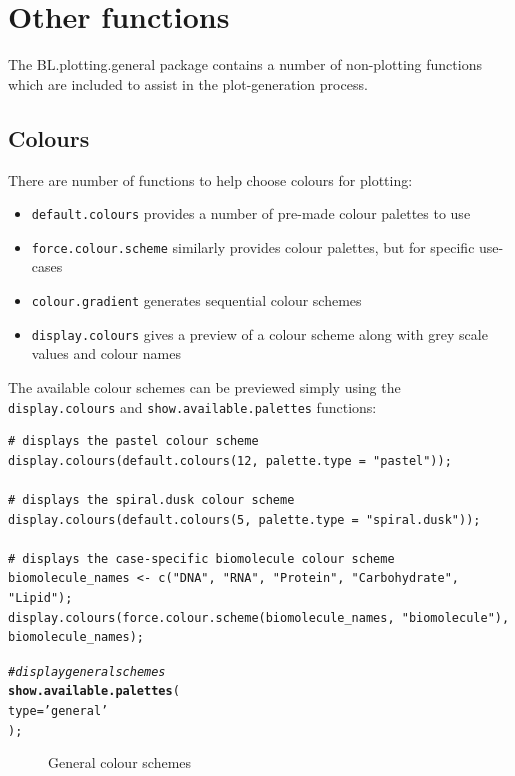 \documentclass[letterpaper]{report}\usepackage[]{graphicx}\usepackage[]{color}
\makeatletter
\newcommand{\hlstr}[1]{\textcolor[rgb]{0.192,0.494,0.8}{#1}}%
\newcommand{\hlcom}[1]{\textcolor[rgb]{0.678,0.584,0.686}{\textit{#1}}}%
\newcommand{\hlstd}[1]{\textcolor[rgb]{0.345,0.345,0.345}{#1}}%
\newcommand{\hlkwc}[1]{\textcolor[rgb]{0.333,0.667,0.333}{#1}}%
\newcommand{\hlkwd}[1]{\textcolor[rgb]{0.737,0.353,0.396}{\textbf{#1}}}%
\newenvironment{kframe}{%
 \def\at@end@of@kframe{}%
 \ifinner\ifhmode%
  \def\at@end@of@kframe{\end{minipage}}%
  \begin{minipage}{\columnwidth}%
 \fi\fi%
 \def\FrameCommand##1{\hskip\@totalleftmargin \hskip-\fboxsep
 \colorbox{shadecolor}{##1}\hskip-\fboxsep
     \hskip-\linewidth \hskip-\@totalleftmargin \hskip\columnwidth}%
 \MakeFramed {\advance\hsize-\width
   \@totalleftmargin\z@ \linewidth\hsize
   \@setminipage}}%
 {\par\unskip\endMakeFramed%
 \at@end@of@kframe}
\newenvironment{knitrout}{}{} %
\makeatother
\begin{document}
\section{Other functions}
The BL.plotting.general package contains a number of non-plotting functions which are included to assist in the plot-generation process. 

\subsection{Colours}
There are number of functions to help choose colours for plotting:
\begin{itemize}
\item \texttt{default.colours} provides a number of pre-made colour palettes to use
\item \texttt{force.colour.scheme} similarly provides colour palettes, but for specific use-cases
\item \texttt{colour.gradient} generates sequential colour schemes
\item \texttt{display.colours} gives a preview of a colour scheme along with grey scale values and colour names
\end{itemize}

The available colour schemes can be previewed simply using the \verb|display.colours| and \verb|show.available.palettes| functions:

\begin{verbatim}
# displays the pastel colour scheme
display.colours(default.colours(12, palette.type = "pastel"));

# displays the spiral.dusk colour scheme
display.colours(default.colours(5, palette.type = "spiral.dusk"));

# displays the case-specific biomolecule colour scheme
biomolecule_names <- c("DNA", "RNA", "Protein", "Carbohydrate", "Lipid");
display.colours(force.colour.scheme(biomolecule_names, "biomolecule"), biomolecule_names);
\end{verbatim}

\begin{knitrout}
\color{fgcolor}\begin{kframe}
\begin{alltt}
\hlcom{# display general schemes}
\hlkwd{show.available.palettes}\hlstd{(}
    \hlkwc{type} \hlstd{=} \hlstr{'general'}
    \hlstd{);}
\end{alltt}
\end{kframe}\begin{figure}

{\centering {} 

}

\caption[General colour schemes]{General colour schemes\label{fig:colour_scheme_general}}
\end{figure}


\end{knitrout}
\end{document}
